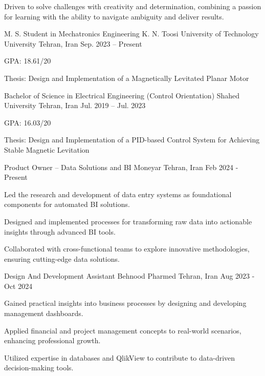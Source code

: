 \documentclass[11pt, a4paper]{awesome-cv}
\begin{document}
	
	\makecvheader[C]
	
Driven to solve challenges with creativity and determination, combining a passion for learning with the ability to navigate ambiguity and deliver results.
	
\begin{cventries}
	\cventry
	{M. S. Student in Mechatronics Engineering} %
	{K. N. Toosi University of Technology University} %
	{Tehran, Iran} %
	{Sep. 2023 -- Present} %
	{
		\begin{cvitems} %
			\item {GPA: 18.61/20}
			\item {Thesis: Design and Implementation of a Magnetically Levitated Planar Motor}
		\end{cvitems}
	}
	\cventry
	{Bachelor of Science in Electrical Engineering (Control Orientation)}
	{Shahed University}
	{Tehran, Iran}
	{Jul. 2019 -- Jul. 2023}
	{
		\begin{cvitems}
			\item {GPA: 16.03/20}
			\item {Thesis: Design and Implementation of a PID-based Control System for Achieving Stable Magnetic Levitation}
		\end{cvitems}
	}
	
	
		\cventry
	{Product Owner – Data Solutions and BI}
	{Moneyar}
	{Tehran, Iran}
	{Feb 2024 - Present}
	{
\begin{cvitems}
	\item {Led the research and development of data entry systems as foundational components for automated BI solutions.}
	\item {Designed and implemented processes for transforming raw data into actionable insights through advanced BI tools.}
	\item {Collaborated with cross-functional teams to explore innovative methodologies, ensuring cutting-edge data solutions.}
\end{cvitems}
	}
	
	
	\cventry
{Design And Development Assistant}
{Behnood Pharmed}
{Tehran, Iran}
{Aug 2023 - Oct 2024}
{
\begin{cvitems}
	\item {Gained practical insights into business processes by designing and developing management dashboards.}
	\item {Applied financial and project management concepts to real-world scenarios, enhancing professional growth.}
	\item {Utilized expertise in databases and QlikView to contribute to data-driven decision-making tools.}
\end{cvitems}
}


\end{cventries}
\end{document}

